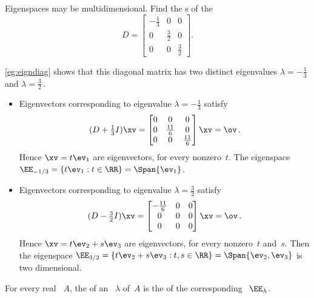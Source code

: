 \begin{example} \label{eg:espace2d}
Eigenspaces may be multidimensional.  
Find the s of the 
\begin{equation*}
D=\begin{bmatrix} -\frac13&0&0\\0&\frac32&0\\0&0&\frac32 \end{bmatrix}.
\end{equation*}
\begin{solution} 
\cref{eg:eigndiag} shows that this diagonal matrix has two distinct eigenvalues \(\lambda=-\frac13\) and \(\lambda=\frac32\)\,.
\begin{itemize}
\item Eigenvectors corresponding to eigenvalue \(\lambda=-\frac13\) satisfy
\begin{equation*}
(D+\tfrac13I)\xv=\begin{bmatrix} 0&0&0\\0&\frac{11}6&0\\0&0&\frac{11}6 \end{bmatrix}\xv=\ov\,.
\end{equation*}
Hence \(\xv=t\ev_1\) are eigenvectors, for every nonzero~\(t\).
The eigenspace \(\EE_{-1/3}=\{t\ev_1 : t\in\RR\}=\Span\{\ev_1\}\).

\item Eigenvectors corresponding to eigenvalue \(\lambda=\frac32\) satisfy
\begin{equation*}
(D-\tfrac32I)\xv=\begin{bmatrix} -\frac{11}6&0&0\\0&0&0\\0&0&0 \end{bmatrix}\xv=\ov\,.
\end{equation*}
Hence \(\xv=t\ev_2+s\ev_3\) are eigenvectors, for every nonzero~\(t\) and~\(s\).
Then the eigenspace \(\EE_{3/2}=\{t\ev_2+s\ev_3 : t,s\in\RR\}=\Span\{\ev_2,\ev_3\}\) is two dimensional.

\end{itemize}
\end{solution}
\end{example}




\begin{definition} \label{def:eigsymult}
For every real ~\(A\), the  of an ~\(\lambda\) of~\(A\) is the  of the corresponding ~\(\EE_\lambda\).
\end{definition}

